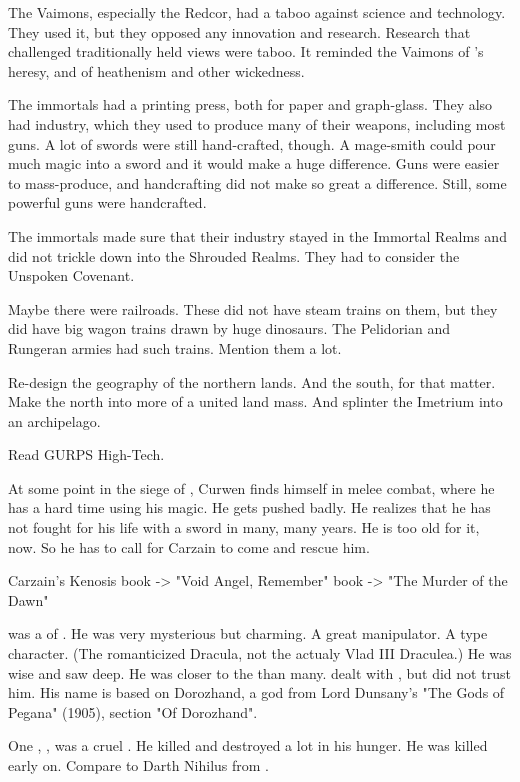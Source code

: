The Vaimons, especially the Redcor, had a taboo against science and technology.
They used it, but they opposed any innovation and research.
Research that challenged traditionally held views were taboo.
It reminded the Vaimons of \Belzir's heresy, and of heathenism and other wickedness.

The immortals had a printing press, both for paper and graph-glass.
They also had industry, which they used to produce many of their weapons, including most guns.
A lot of swords were still hand-crafted, though.
A mage-smith could pour much magic into a sword and it would make a huge difference.
Guns were easier to mass-produce, and handcrafting did not make so great a difference.
Still, some powerful guns were handcrafted.

The immortals made sure that their industry stayed in the Immortal Realms and did not trickle down into the Shrouded Realms.
They had to consider the Unspoken Covenant.

Maybe there were railroads.
These did not have steam trains on them, but they did have big wagon trains drawn by huge dinosaurs.
The Pelidorian and Rungeran armies had such trains.
Mention them a lot.

Re-design the geography of the northern lands. 
And the south, for that matter.
Make the north into more of a united land mass.
And splinter the Imetrium into an archipelago.

Read GURPS High-Tech.

At some point in the siege of \Forklin, Curwen finds himself in melee combat, where he has a hard time using his magic.
He gets pushed badly.
He realizes that he has not fought for his life with a sword in many, many years.
He is too old for it, now.
So he has to call for Carzain to come and rescue him.

Carzain's Kenosis book -> "Void Angel, Remember"
\Merkyrah book -> "The Murder of the Dawn"

\Dorzand was a \sathariah of \TiphredSerah.
He was very mysterious but charming.
A great manipulator.
A  type character. 
(The romanticized Dracula, not the actualy Vlad III Draculea.)
He was wise and saw deep.
He was closer to the \banelords than many.
\Azraid dealt with \Dorzand, but did not trust him.
His name is based on Dorozhand, a god from Lord Dunsany's "The Gods of Pegana" (1905), section "Of Dorozhand".

One \sathariah, \Mehaloch, was a cruel .
He killed and destroyed a lot in his hunger.
He was killed early on.
Compare to Darth Nihilus from \cite{VideoGame:KOTORII}.

